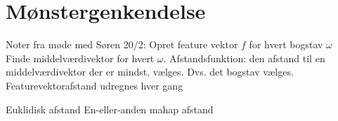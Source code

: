 \section{Mønstergenkendelse}
Noter fra møde med Søren 20/2:
Opret feature vektor $f$ for hvert bogstav $\omega$
Finde middelværdivektor for hvert $\omega$.
Afstandsfunktion: den afstand til en middelværdivektor der er mindst, vælges. Dvs. det bogstav vælges.
Featurevektorafstand udregnes hver gang

Euklidisk afstand
En-eller-anden mahap afstand